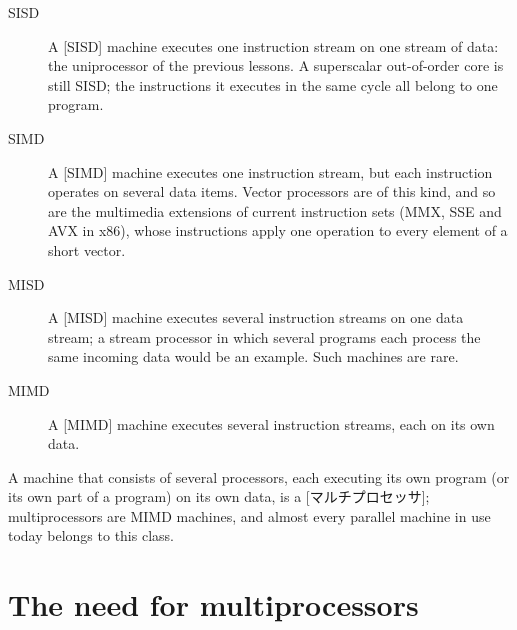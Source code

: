 \documentclass[../main.tex]{subfiles}
\begin{document}
\begin{description}
  \item[SISD] A [SISD]%
     machine executes one
    instruction stream on one stream of data: the uniprocessor of the
    previous lessons.  A superscalar out-of-order core is still SISD; the
    instructions it executes in the same cycle all belong to one program.
  \item[SIMD] A [SIMD]%
     machine executes one
    instruction stream, but each instruction operates on several data items.
    Vector processors are of this kind, and so are the multimedia extensions
    of current instruction sets (MMX, SSE and AVX in x86), whose
    instructions apply one operation to every element of a short vector.
  \item[MISD] A [MISD]%
     machine executes
    several instruction streams on one data stream; a stream processor in
    which several programs each process the same incoming data would be an
    example.  Such machines are rare.
  \item[MIMD] A [MIMD]%
     machine executes
    several instruction streams, each on its own data.
\end{description}

A machine that consists of several processors, each executing its own
program (or its own part of a program) on its own data, is a
[マルチプロセッサ]; multiprocessors are MIMD machines,
and almost every parallel machine in use today belongs to this class.

\section{The need for multiprocessors}
\label{sec:l18-why}
\end{document}
